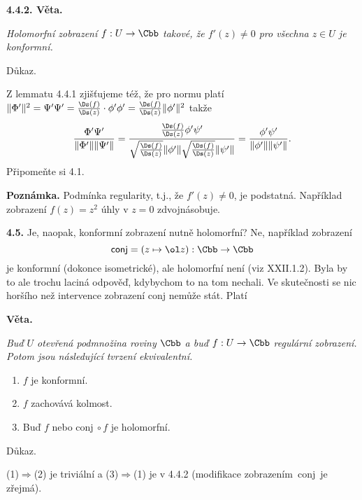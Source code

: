 \documentclass[12pt]{article}
\begin{document}
\medskip


{\bf 4.4.2. Věta.} {\em Holomorfní zobrazení  $f:U\to\Cbb$ takové, že $f'(z)\neq 0$ pro všechna $z\in U$ je konformní.

Důkaz.} Z lemmatu 4.4.1  zjišťujeme též, že pro normu platí $\|\Phi'\|^2= \Psi'\Psi'=
\frac{\Ds(f)}{\Ds(z)}\cdot\phi'\phi'=\frac{\Ds(f)}{\Ds(z)}\|\phi'\|^2$ takže
$$
\frac{\Phi'\Psi'}{\|\Phi'\| \|\Psi'\|}=
\frac{\frac{\Ds(f)}{\Ds(z)}\phi'\psi'}{\sqrt{\frac{\Ds(f)}{\Ds(z)}}\|\phi'\|\sqrt{\frac{\Ds(f)}{\Ds(z)}} \|\psi'\|}=\frac{\phi'\psi'}{\|\phi'\| \|\psi'\|}.
$$
Připomeňte si 4.1. \sq

\medskip 

{\bf Poznámka.} Podmínka regularity, t.j., že $f'(z)\neq 0$, je podstatná.
Například zobrazení $f(z)=z^2$ úhly v  $z=0$ zdvojnásobuje.

\bigskip

{\bf 4.5.} Je, naopak, konformní zobrazení nutně holomorfní? Ne, například zobrazení
$$
\text{\sf conj}=(z\mapsto\ol z):\Cbb\to\Cbb
$$
je konformní (dokonce isometrické), ale holomorfní není (viz XXII.1.2).
Byla by to ale trochu laciná odpověď, kdybychom to na tom nechali.
Ve skutečnosti se nic horšího než intervence zobrazení {\sf conj} nemůže stát.
Platí

\medskip

{\bf Věta.} {\em Buď $U$ otevřená podmnožina roviny $\Cbb$ a buď $f:U\to \Cbb$ regulární zobrazení. Potom jsou následující tvrzení ekvivalentní.
\begin{enumerate}
\item $f$ je konformní.
\item $f$ zachovává kolmost.
\item Buď $f$ nebo {\sf conj}$\ \circ f$ je holomorfní.
\end{enumerate}

Důkaz.} (1)$\Rightarrow$(2) je triviální a (3)$\Rightarrow$(1) je v 4.4.2 (modifikace zobrazením\ {\sf conj}\ je zřejmá).

\smallskip
\end{document}
